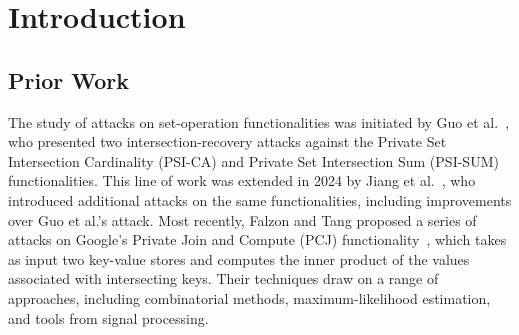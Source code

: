 \section{Introduction}


\subsection{Prior Work}

The study of attacks on set-operation functionalities was initiated by Guo et al.~\cite{USENIX:GHLWJL22}, who presented two intersection-recovery attacks against the Private Set Intersection Cardinality (PSI-CA) and Private Set Intersection Sum (PSI-SUM) functionalities. This line of work was extended in 2024 by Jiang et al.~\cite{NDSS:JiaDuYan24}, who introduced additional attacks on the same functionalities, including improvements over Guo et al.’s attack. Most recently, Falzon and Tang \cite{USENIX:FalTan25} proposed a series of attacks on Google’s Private Join and Compute (PCJ) functionality~\cite{AC:LPRST21}, which takes as input two key-value stores and computes the inner product of the values associated with intersecting keys. Their techniques draw on a range of approaches, including combinatorial methods, maximum-likelihood estimation, and tools from signal processing.

